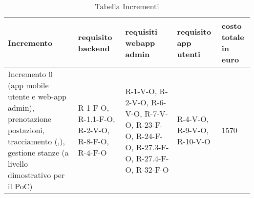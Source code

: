 \hypertarget{TabellaIncrementi}{}
\begin{longtable}{ C{0.20\textwidth} C{0.15\textwidth} C{0.15\textwidth} C{0.20\textwidth} C{0.15\textwidth} }
    \caption{Tabella Incrementi}                                                                                 \\
    \rowcolor{\primaryColor}
    \textcolor{\secondaryColor}{\textbf{Incremento}} & \textcolor{\secondaryColor}{\textbf{requisito backend}}  &\textcolor{\secondaryColor}{\textbf{requisiti webapp admin}}&\textcolor{\secondaryColor}{\textbf{requisito app utenti}}&\textcolor{\secondaryColor}{\textbf{costo totale in euro}}\\ \endhead
    {Incremento 0  (app mobile utente e web-app admin), prenotazione postazioni, tracciamento (,), gestione stanze (a livello dimostrativo per il PoC)} & {R-1-F-O, R-1.1-F-O, R-2-V-O, R-8-F-O, R-4-F-O} & {R-1-V-O, R-2-V-O, R-6-V-O, R-7-V-O, R-23-F-O, R-24-F-O, R-27.3-F-O, R-27.4-F-O, R-32-F-O} & {R-4-V-O, R-9-V-O, R-10-V-O}&  {1570}\\
    
    

\end{longtable}
